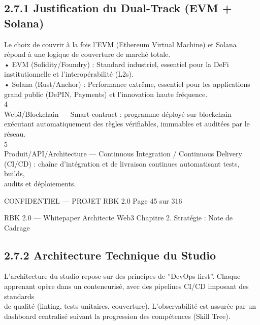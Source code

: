\subsection{2.7.1 Justification du Dual-Track (EVM + Solana)}
Le choix de couvrir à la fois l’EVM (Ethereum Virtual Machine) et Solana répond à une logique de couverture de marché totale.\\
• EVM (Solidity/Foundry) : Standard industriel, essentiel pour la DeFi institutionnelle et l’interopérabilité (L2s).\\
• Solana (Rust/Anchor) : Performance extrême, essentiel pour les applications grand public (DePIN, Payments) et l’innovation haute fréquence.\\
4\\
Web3/Blockchain — Smart contract : programme déployé sur blockchain exécutant automatiquement des règles vérifiables, immuables et auditées par le réseau.\\
5\\
Produit/API/Architecture — Continuous Integration / Continuous Delivery (CI/CD) : chaîne d’intégration et de livraison continues automatisant tests, builds,\\
audits et déploiements.\\
\vspace{0.5em}
\vspace{0.5em}
\vspace{0.5em}
\vspace{0.5em}
\begin{confidential}CONFIDENTIEL — PROJET RBK 2.0                                              Page 45 sur 316\end{confidential}
RBK 2.0 — Whitepaper Architecte Web3                                                                                      Chapitre 2. Stratégie : Note de Cadrage\\
\vspace{0.5em}
\vspace{0.5em}
\subsection{2.7.2 Architecture Technique du Studio}
L’architecture du studio repose sur des principes de ”DevOps-first”. Chaque apprenant opère dans un conteneurisé, avec des pipelines CI/CD imposant des standards\\
de qualité (linting, tests unitaires, couverture). L’observabilité est assurée par un dashboard centralisé suivant la progression des compétences (Skill Tree).\\
\vspace{0.5em}
\vspace{0.5em}
\vspace{0.5em}
